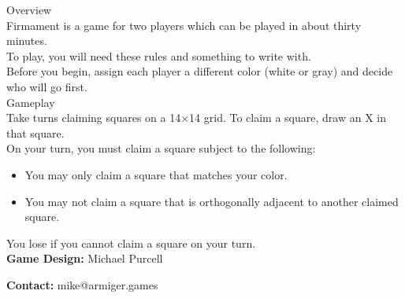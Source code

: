 \begin{minipage}{6cm}\raggedright
{\setmainfont[Scale=0.95]{Century Gothic-Bold}\LARGE Overview}\\[1.0ex]

\setmainfont{Tex Gyre Schola}
Firmament is a game for two players which can be played in about thirty minutes.\\[1.25ex]

To play, you will need these rules and something to write with.\\[1.25ex]

Before you begin, assign each player a different color (white or gray) and decide who will go first.\\[3ex]

{\setmainfont[Scale=0.95]{Century Gothic-Bold}\LARGE Gameplay}\\[1.0ex]

Take turns claiming squares on a 14$\times$14 grid. To claim a square, draw an {\setmainfont[Scale=0.95]{Century Gothic-Bold} X} in that square. \\[1.25ex]

On your turn, you must claim a square subject to the following:
\begin{itemize}[leftmargin=*]
	\item You may only claim a square that matches your color.
	\item You may not claim a square that is orthogonally adjacent to another claimed square.
\end{itemize}

You lose if you cannot claim a square on your turn.\\[1.25ex]

\textbf{Game Design:} Michael Purcell

\textbf{Contact:} mike@armiger.games
\end{minipage}